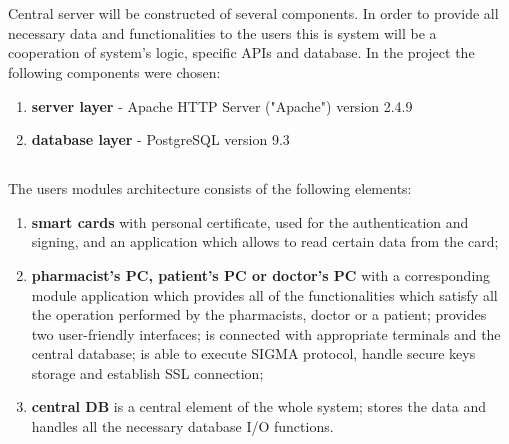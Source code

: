 \section{}

\subsection{}

Central server will be constructed of several components. In order to provide all necessary data and functionalities to the users this is system will be a cooperation of system's logic, specific APIs and database. In the project the following components were chosen:
\begin{enumerate}
\item \textbf{server layer} - Apache HTTP Server ("Apache") version 2.4.9
\item \textbf{database layer} - PostgreSQL version 9.3
\end{enumerate}

\subsection{}

The users modules architecture consists of the following elements:
\begin{enumerate}
\item \textbf{smart cards} with personal certificate, used for the authentication and signing, and an application which allows to read certain data from the card;
\item \textbf{pharmacist's PC, patient's PC or doctor's PC } with a corresponding module application which provides all of the functionalities which satisfy all the operation performed by the pharmacists, doctor or a patient; provides two user-friendly interfaces; is connected with appropriate terminals and the central database; is able to execute SIGMA protocol, handle secure keys storage and establish SSL connection;
\item{\textbf{central DB}} is a central element of the whole system; stores the data and handles all the necessary database I/O functions.
\end{enumerate}


\section{}

